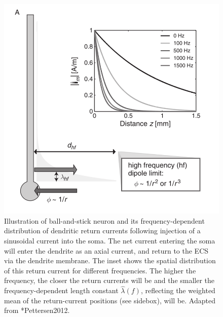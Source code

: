\begin{figure}[!ht]
\begin{center}
\includegraphics{Figures/Spikes/Spikes-ball-and-stick-sketch-w70-r300}
\end{center}
\caption[]{Illustration of ball-and-stick neuron and its frequency-dependent 
distribution of dendritic return currents following injection of a sinusoidal current into the soma.
The net current entering the soma will enter the dendrite as an axial current, and return to the 
ECS via the dendrite membrane. The inset shows the spatial distribution of this return current
for different frequencies. The higher the frequency, the closer the return currents will be and
the smaller the frequency-dependent length constant $\hat{\lambda}(f)$, reflecting the weighted mean 
of the return-current positions (see sidebox), will be. 
 Adapted from \citeasnoun**{Pettersen2012}.
}
\label{Spikes:fig:ball-and-stick-sketch}
\end{figure}
%

